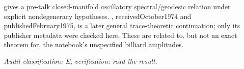 \citet[introduction and main theorem]{colindeverdiere1973geodesicsii} gives a pre-talk closed-manifold oscillatory spectral/geodesic relation under explicit nondegeneracy hypotheses. \citet{duistermaatguillemin1975spectrum}, receivedOctober1974 and publishedFebruary1975, is a later general trace-theoretic continuation; only its publisher metadata were checked here. These are related to, but not an exact theorem for, the notebook’s unspecified billiard amplitudes.

\emph{Audit classification: E; verification: read the result.}
